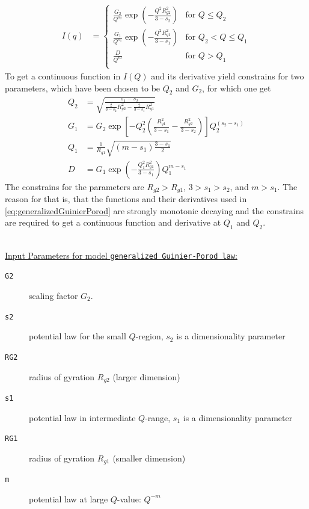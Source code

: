 \begin{align}
I(q) &=
\begin{cases}
  \frac{G_2}{Q^{s_2}} \exp\left(-\frac{Q^2R^2_{g2}}{3-s_2}\right)& \mbox{for } Q \leq Q_2\\
  \frac{G_1}{Q^{s_1}} \exp\left(-\frac{Q^2R^2_{g1}}{3-s_1}\right)& \mbox{for } Q_2 < Q\leq Q_1\\
  \frac{D}{Q^m} & \mbox{for } Q > Q_1 \\
\end{cases}
\label{eq:generalizedGuinierPorod}
\end{align}
To get a continuous function in $I(Q)$ and its derivative yield constrains for two parameters, which have been chosen to be $Q_2$ and $G_2$, for which one get
\begin{align}
Q_2 &= \sqrt{\frac{s_1-s_2}{\frac{2}{3-s_2}R^2_{g2}-\frac{2}{3-s_1}R^2_{g1}}}\\
G_1 &= G_2 \exp\left[-Q_2^2\left(\frac{R^2_{g1}}{3-s_1}-\frac{R_{g2}^2}{3-s_2}\right)\right] Q_2^{(s_2-s_1)} \\
Q_1 &= \frac{1}{R_{g1}}\sqrt{\left(m-s_1\right)\frac{3-s_1}{2}} \\
D   &= G_1 \exp\left(-\frac{Q_1^2 R_{g1}^2}{3-s_1}\right) Q_1^{m-s_1}
\label{eq:generalizedGuinierPorodConstrains}
\end{align}
The constrains for the parameters are $R_{g2}>R_{g1}$, $3>s_1>s_2$, and $m>s_1$. The reason for that is, that the functions and their derivatives used in \ref{eq:generalizedGuinierPorod} are strongly monotonic decaying and the constrains are required to get a continuous function and derivative at $Q_1$ and $Q_2$.

\hspace{1pt}\\
\uline{Input Parameters for model \texttt{generalized Guinier-Porod law}:}\\
\begin{description}
\item[\texttt{G2}] scaling factor $G_2$.
\item[\texttt{s2}] potential law for the small $Q$-region, $s_2$ is a dimensionality parameter
\item[\texttt{RG2}] radius of gyration $R_{g2}$ (larger dimension)
\item[\texttt{s1}] potential law in intermediate $Q$-range, $s_1$ is a dimensionality parameter
\item[\texttt{RG1}] radius of gyration $R_{g1}$ (smaller dimension)
\item[\texttt{m}] potential law at large $Q$-value: $Q^{-m}$
\end{description}

